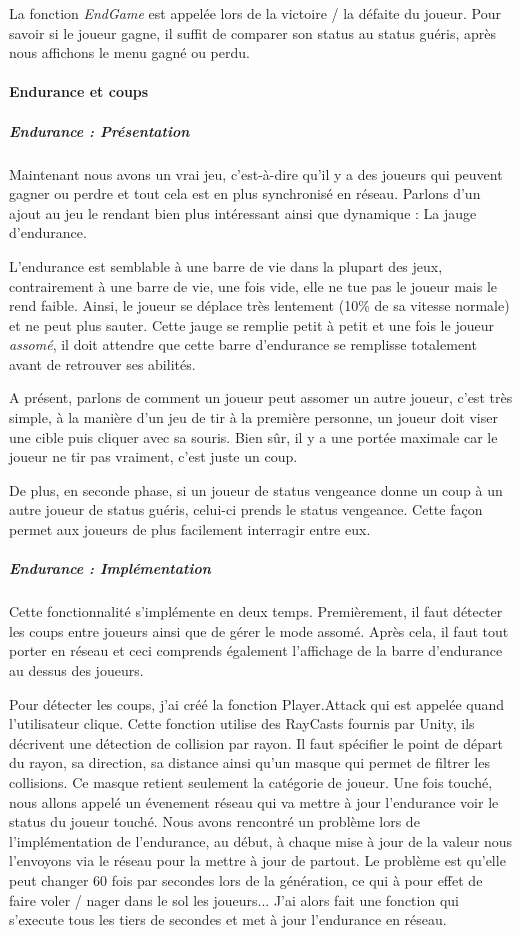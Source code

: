 \documentclass{article}
\begin{document}
La fonction \emph{EndGame} est appelée lors de la victoire / la défaite du joueur. Pour savoir si le joueur gagne, il suffit de comparer son status au status guéris, après nous affichons le menu gagné ou perdu.

\paragraph{Endurance et coups}

\subparagraph{Endurance : Présentation}

Maintenant nous avons un vrai jeu, c'est-à-dire qu'il y a des joueurs qui peuvent gagner ou perdre et tout cela est en plus synchronisé en réseau. Parlons d'un ajout au jeu le rendant bien plus intéressant ainsi que dynamique : La jauge d'endurance.

L'endurance est semblable à une barre de vie dans la plupart des jeux, contrairement à une barre de vie, une fois vide, elle ne tue pas le joueur mais le rend faible. Ainsi, le joueur se déplace très lentement (10\% de sa vitesse normale) et ne peut plus sauter. Cette jauge se remplie petit à petit et une fois le joueur \emph{assomé}, il doit attendre que cette barre d'endurance se remplisse totalement avant de retrouver ses abilités.

A présent, parlons de comment un joueur peut assomer un autre joueur, c'est très simple, à la manière d'un jeu de tir à la première personne, un joueur doit viser une cible puis cliquer avec sa souris. Bien sûr, il y a une portée maximale car le joueur ne tir pas vraiment, c'est juste un coup.

De plus, en seconde phase, si un joueur de status vengeance donne un coup à un autre joueur de status guéris, celui-ci prends le status vengeance. Cette façon permet aux joueurs de plus facilement interragir entre eux.

\subparagraph{Endurance : Implémentation}

Cette fonctionnalité s'implémente en deux temps. Premièrement, il faut détecter les coups entre joueurs ainsi que de gérer le mode assomé. Après cela, il faut tout porter en réseau et ceci comprends également l'affichage de la barre d'endurance au dessus des joueurs.

Pour détecter les coups, j'ai créé la fonction Player.Attack qui est appelée quand l'utilisateur clique. Cette fonction utilise des RayCasts fournis par Unity, ils décrivent une détection de collision par rayon. Il faut spécifier le point de départ du rayon, sa direction, sa distance ainsi qu'un masque qui permet de filtrer les collisions. Ce masque retient seulement la catégorie de joueur.
Une fois touché, nous allons appelé un évenement réseau qui va mettre à jour l'endurance voir le status du joueur touché.
Nous avons rencontré un problème lors de l'implémentation de l'endurance, au début, à chaque mise à jour de la valeur nous l'envoyons via le réseau pour la mettre à jour de partout. Le problème est qu'elle peut changer 60 fois par secondes lors de la génération, ce qui à pour effet de faire voler / nager dans le sol les joueurs... J'ai alors fait une fonction qui s'execute tous les tiers de secondes et met à jour l'endurance en réseau.
\end{document}
